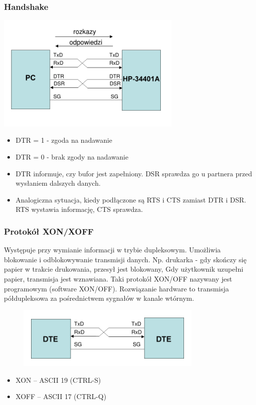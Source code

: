 		\subsubsection{Handshake}
		\includegraphics[width=9cm]{./wyklady/RS232_9_1.pdf}\vspace{-10pt}
		\begin{itemize}
			\item DTR = 1 - zgoda na nadawanie
			\item DTR = 0 - brak zgody na nadawanie
			\item DTR informuje, czy bufor jest zapełniony. DSR sprawdza go u partnera przed wysłaniem dalszych danych.
			\item Analogiczna sytuacja, kiedy podłączone są RTS i CTS zamiast DTR i DSR. RTS wystawia informację, CTS sprawdza.
		\end{itemize}
		\subsubsection{Protokół XON/XOFF}
			Występuje przy wymianie informacji w trybie dupleksowym. Umożliwia blokowanie i odblokowywanie transmisji danych. Np. drukarka - gdy skończy się papier w trakcie drukowania, przesył jest blokowany, Gdy użytkownik uzupełni papier, transmisja jest wznawiana. Taki protokół XON/OFF nazywany jest programowym (software XON/OFF). {\small Rozwiązanie hardware to transmisja półdupleksowa za pośrednictwem sygnałów w kanale wtórnym.}\\
			\begin{figure}
				\vspace{-20pt}
				\includegraphics[width=9cm]{./wyklady/RS232_9_2.pdf}
			\end{figure}
			\begin{itemize}
				\item XON – ASCII 19 (CTRL-S)
				\item XOFF – ASCII 17 (CTRL-Q)
			\end{itemize}
	\clearpage
